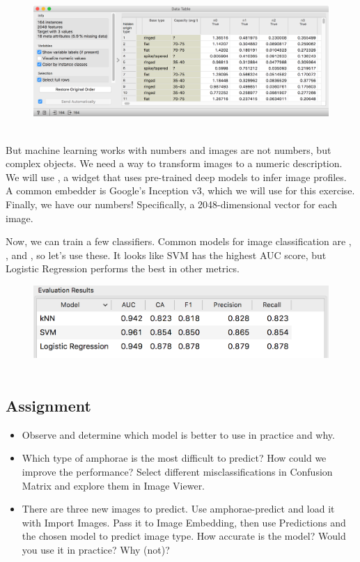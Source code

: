 \begin{figure}[h]
    \centering
    \includegraphics[width=\textwidth]{embeddings.png}
    \caption{$\;$} %
\end{figure}

But machine learning works with numbers and images are not numbers, but complex objects. We need a way to transform images to a numeric description. We will use , a widget that uses pre-trained deep models to infer image profiles. A common embedder is Google's Inception v3, which we will use for this exercise. Finally, we have our numbers! Specifically, a 2048-dimensional vector for each image.

Now, we can train a few classifiers. Common models for image classification are , , and , so let's use these. It looks like SVM has the highest AUC score, but Logistic Regression performs the best in other metrics.

\begin{figure}[h]
    \centering
    \includegraphics[scale=0.5]{test-and-score.png}
    \caption{$\;$} %
\end{figure}

\subsection{Assignment}

\begin{itemize}
    \item Observe  and determine which model is better to use in practice and why.
    \item Which type of amphorae is the most difficult to predict? How could we improve the performance? Select different misclassifications in Confusion Matrix and explore them in Image Viewer.
    \item There are three new images to predict. Use amphorae-predict and load it with Import Images. Pass it to Image Embedding, then use Predictions and the chosen model to predict image type. How accurate is the model? Would you use it in practice? Why (not)?
\end{itemize}

